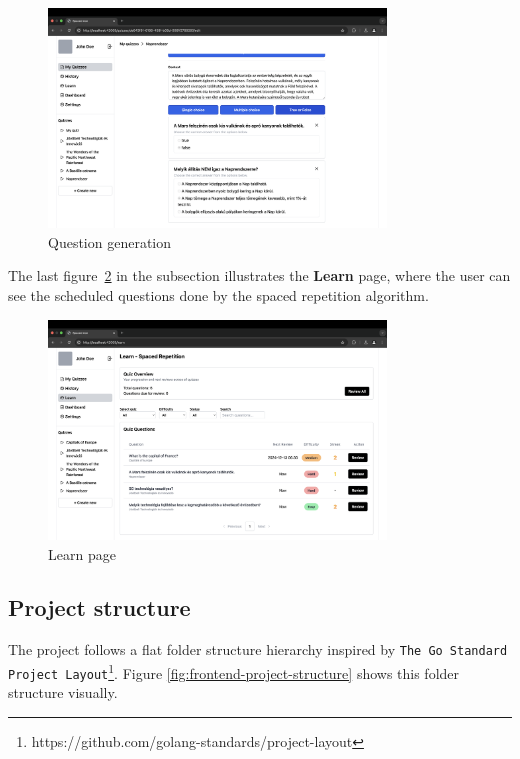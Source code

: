 \begin{figure}[H]
	\centering
	\includegraphics[width=0.8\textwidth, keepaspectratio]{figures/screenshot-question-generation.png}
	\caption{Question generation}
	\label{fig:screenshot-question-generation}
\end{figure}

The last figure~\ref{fig:screenshot-learn-page} in the subsection illustrates the \textbf{Learn} page, where the user can see the scheduled questions done by the spaced repetition algorithm.

\begin{figure}[H]
	\centering
	\includegraphics[width=0.8\textwidth, keepaspectratio]{figures/screenshot-learn-page.png}
	\caption{Learn page}
	\label{fig:screenshot-learn-page}
\end{figure}

\subsection{Project structure}

The project follows a flat folder structure hierarchy inspired by \texttt{The Go Standard Project Layout}\footnote{https://github.com/golang-standards/project-layout}. Figure \ref{fig:frontend-project-structure} shows this folder structure visually.

